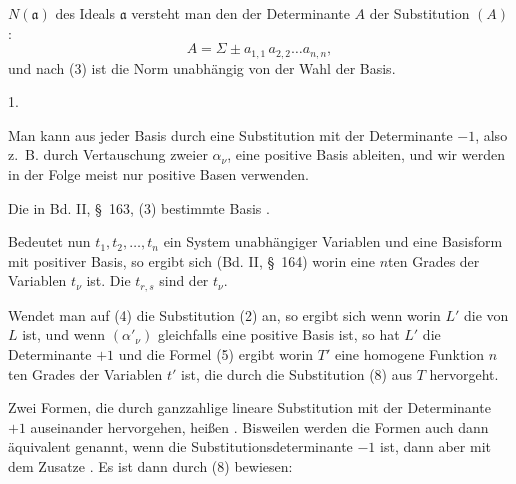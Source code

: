 
 $N(\mathfrak{a})$ des Ideals $\mathfrak{a}$ versteht man den
 der Determinante $A$ der Substitution $(A)$:
\[
A = \Sigma \pm a_{1,1}\,a_{2,2}\ldots a_{n,n},
\]
und nach (3) ist die Norm unabhängig von der Wahl der Basis.

1. 

Man kann aus jeder Basis durch eine Substitution mit der
Determinante $-1$, also z.\ B. durch Vertauschung zweier $\alpha_\nu$, eine
positive Basis ableiten, und wir werden in der Folge meist nur
positive Basen verwenden.

Die in Bd. II, \S\ 163, (3) bestimmte Basis .

Bedeutet nun $t_1, t_2, \ldots, t_n$ ein System unabhängiger Vari\-ablen und
eine Basisform mit positiver Basis, so ergibt sich (Bd. II, \S\ 164)
worin
eine  $n$ten Grades der
Variablen $t_\nu$ ist. Die $t_{r,s}$ sind  der $t_\nu$.

Wendet man auf (4) die Substitution (2) an, so ergibt sich
wenn
worin $L'$ die  von $L$ ist, und wenn
$(\alpha'_\nu)$ gleichfalls eine positive Basis ist, so hat $L'$ die
Determinante $+1$ und die Formel (5) ergibt
worin $T'$ eine homogene Funktion $n$ten Grades der Variablen $t'$
ist, die durch die Substitution (8) aus $T$ hervorgeht.

Zwei Formen, die durch ganzzahlige lineare Substitution mit
der Determinante $+1$ auseinander hervorgehen, heißen . Bisweilen werden die Formen auch dann äquivalent
genannt, wenn die Substitutionsdeterminante $-1$ ist, dann aber
mit dem Zusatze \glqq {}\grqq{}. Es ist dann durch (8) bewiesen:
